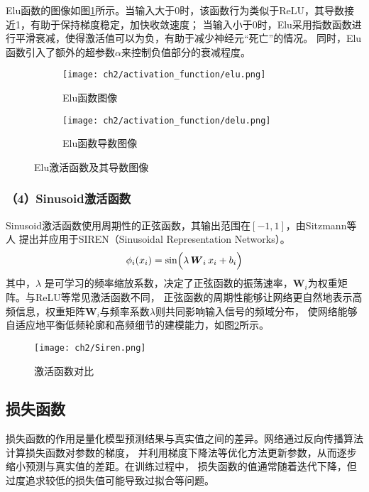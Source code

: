 Elu函数的图像如图\ref{fig:elu}所示。当输入大于0时，该函数行为类似于ReLU，其导数接近1，有助于保持梯度稳定，加快收敛速度；
当输入小于0时，Elu采用指数函数进行平滑衰减，使得激活值可以为负，有助于减少神经元“死亡”的情况。
同时，Elu函数引入了额外的超参数$\alpha$来控制负值部分的衰减程度。

\begin{figure}[H]
  \centering
  \begin{subfigure}[t]{0.45\textwidth}
    \centering
    \texttt{[image: ch2/activation\_function/elu.png]}
    \caption{Elu函数图像}
  \end{subfigure}
  \begin{subfigure}[t]{0.45\textwidth}
    \centering
    \texttt{[image: ch2/activation\_function/delu.png]}
    \caption{Elu函数导数图像}
  \end{subfigure}
  \caption{Elu激活函数及其导数图像}
  \label{fig:elu}
\end{figure}

\subsubsection*{（4）Sinusoid激活函数}

Sinusoid激活函数使用周期性的正弦函数，其输出范围在$[-1,1]$，由Sitzmann等人\cite{sitzmann2020implicit}
提出并应用于SIREN（Sinusoidal Representation Networks）。
\begin{equation}\label{eq:siren}
\phi_i(x_i)=\sin\Bigl(\lambda\,{\boldsymbol{W}}_i\,x_i+b_i\Bigr)
\end{equation}
其中，$\lambda$ 是可学习的频率缩放系数，决定了正弦函数的振荡速率，${\boldsymbol{W}}_i$为权重矩阵。与ReLU等常见激活函数不同，
正弦函数的周期性能够让网络更自然地表示高频信息，权重矩阵${\boldsymbol{W}}_i$与频率系数$\lambda$则共同影响输入信号的频域分布，
使网络能够自适应地平衡低频轮廓和高频细节的建模能力，如图\ref{fig:siren_compare}所示。

\begin{figure}[htb]
  \centering
  \texttt{[image: ch2/Siren.png]}
  \caption{激活函数对比\cite{sitzmann2020implicit}}
  \label{fig:siren_compare}
\end{figure}

\subsection{损失函数}

损失函数的作用是量化模型预测结果与真实值之间的差异。网络通过反向传播算法计算损失函数对参数的梯度，
并利用梯度下降法等优化方法更新参数，从而逐步缩小预测与真实值的差距。在训练过程中，
损失函数的值通常随着迭代下降，但过度追求较低的损失值可能导致过拟合等问题。

